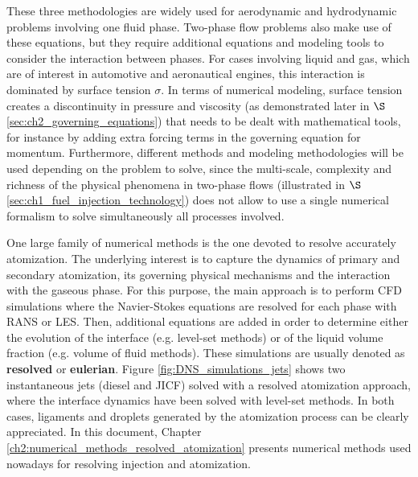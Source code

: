 These three methodologies are widely used for aerodynamic and hydrodynamic problems involving one fluid phase. Two-phase flow problems also make use of these equations, but they require additional equations and modeling tools to consider the interaction between phases. For cases involving liquid and gas, which are of interest in automotive and aeronautical engines, this interaction is dominated by surface tension $\sigma$. In terms of numerical modeling, surface tension creates a discontinuity in pressure and viscosity (as demonstrated later in $\S$\ref{sec:ch2_governing_equations}) that needs to be dealt with mathematical tools, for instance by adding extra forcing terms in the governing equation for momentum. Furthermore, different methods and modeling methodologies will be used depending on the problem to solve, since the multi-scale, complexity and richness of the physical phenomena in two-phase flows (illustrated in $\S$\ref{sec:ch1_fuel_injection_technology}) does not allow to use a single numerical formalism to solve simultaneously all processes involved.

One large family of numerical methods is the one devoted to resolve accurately atomization. The underlying interest is to capture the dynamics of primary and secondary atomization, its governing physical mechanisms and the interaction with the gaseous phase. For this purpose, the main approach is to perform CFD simulations where the Navier-Stokes equations are resolved for each phase with RANS or LES. Then, additional equations are added in order to determine either the evolution of the interface (e.g. level-set methods) or of the liquid volume fraction (e.g. volume of fluid methods). These simulations are usually denoted as \textbf{resolved} or \textbf{eulerian}. Figure \ref{fig:DNS_simulations_jets} shows two instantaneous jets (diesel and JICF) solved with a resolved atomization approach, where the interface dynamics have been solved with level-set methods. In both cases, ligaments and droplets generated by the atomization process can be clearly appreciated. In this document, Chapter \ref{ch2:numerical_methods_resolved_atomization} presents numerical methods used nowadays for resolving injection and atomization.

